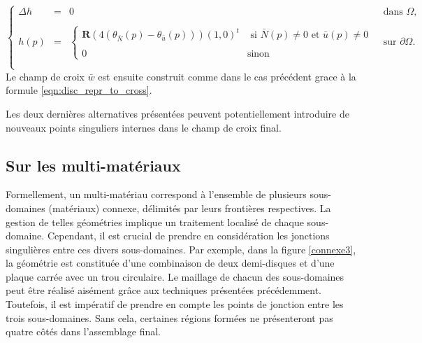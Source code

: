 \begin{equation}
\left\{
\begin{array}{lcll}
    \Delta h &=& 0 & \mbox{ dans }\Omega,\\\\
    h(p) &=&
    \left\{
    \begin{array}{ll}
        \mathbf{R}\displaystyle\left(4(\theta_{\bar{N}}(p)-\theta_{\bar{u}}(p))\right)(1, 0)^t &\text{ si }\bar{N}(p)\neq 0\mbox{ et }\bar{u}(p)\neq 0\\\\
        0& \text{sinon}
    \end{array}
    \right.
    &\mbox{ sur }\partial\Omega.\\\\
\end{array}
\right.
\label{eqn:disc_lefeu_2}
\end{equation}
Le champ de croix $\bar{w}$ est ensuite construit comme dans le cas précédent grace à la formule \ref{eqn:disc_repr_to_cross}.

\begin{remark}
Les deux dernières alternatives présentées peuvent potentiellement introduire de nouveaux points singuliers internes dans le champ de croix final.
\end{remark}


\subsection{Sur les multi-matériaux}

Formellement, un multi-matériau correspond à l'ensemble de plusieurs sous-domaines (matériaux) connexe, délimités par leurs frontières respectives. La gestion de telles géométries implique un traitement localisé de chaque sous-domaine. Cependant, il est crucial de prendre en considération les jonctions singulières entre ces divers sous-domaines. Par exemple, dans la figure \ref{connexe3}, la géométrie est constituée d'une combinaison de deux demi-disques et d'une plaque carrée avec un trou circulaire. Le maillage de chacun des sous-domaines peut être réalisé aisément grâce aux techniques présentées précédemment. Toutefois, il est impératif de prendre en compte les points de jonction entre les trois sous-domaines. Sans cela, certaines régions formées ne présenteront pas quatre côtés dans l'assemblage final.

